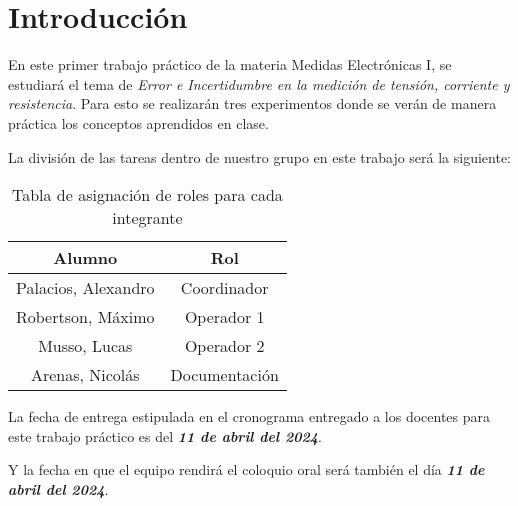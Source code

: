 \vspace{1.5cm}
\section{Introducción}

En este primer trabajo práctico de la materia Medidas Electrónicas I, se estudiará el tema de \textit{Error e Incertidumbre en la medición de tensión, corriente y resistencia}. Para esto se realizarán tres experimentos donde se verán de manera práctica los conceptos aprendidos en clase.

La división de las tareas dentro de nuestro grupo en este trabajo será la siguiente: 

\begin{table}[h!]
    \centering
    \begin{tabular}{|c|c|}
    \hline
        Alumno & Rol \\
    \hline
        Palacios, Alexandro & Coordinador \\
        Robertson, Máximo & Operador 1 \\ 
        Musso, Lucas & Operador 2 \\
        Arenas, Nicolás & Documentación \\
    \hline
        \end{tabular}
        \def\tablename{Tabla} 
        \caption{Tabla de asignación de roles para cada integrante}
        \label{tab:roles}
\end{table}

La fecha de entrega estipulada en el cronograma entregado a los docentes para este trabajo práctico es del \textbf{\textit{11 de abril del 2024}}.

Y la fecha en que el equipo rendirá el coloquio oral será también el día \textbf{\textit{11 de abril del 2024}}.